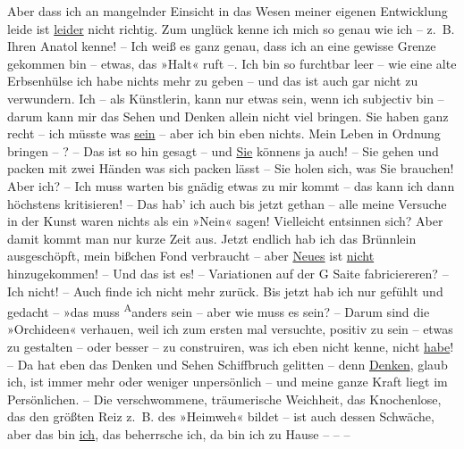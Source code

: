 \pstart
            Aber dass ich \introOben{}an\introOben{} mangelnder Einsicht in das Wesen meiner
               eigenen Entwicklung leide ist \uline{leider} nicht richtig.
               Zum unglück kenne ich mich so genau wie ich – z. B. Ihren Anatol kenne! – Ich weiß es ganz genau, dass ich an eine
               gewisse Grenze gekommen bin – etwas, das »Halt« ruft –. Ich bin so furchtbar leer –
               wie eine alte Erbsenhülse {\pb}ich habe nichts mehr zu geben – und das ist
               auch gar nicht zu verwundern. Ich – als Künstlerin, kann nur etwas sein, wenn ich
               subjectiv bin – darum kann mir das Sehen und Denken \introOben{}allein\introOben{}
               nicht viel bringen. Sie haben ganz recht – ich müsste was \uline{sein} – aber ich bin eben nichts. Mein Leben in Ordnung bringen – ? – Das ist
               so hin gesagt – und \uline{Sie} könnens ja auch! – Sie gehen
               und packen mit zwei Händen was sich packen lässt – Sie holen sich, was Sie brauchen!
               Aber ich? – Ich muss warten bis gnädig etwas zu mir kommt – das kann ich \introOben{}dann\introOben{} höchstens kritisieren! – Das hab' ich auch bis jetzt
               gethan – alle meine Versuche in der Kunst waren nichts als ein »Nein« sagen!
               Vielleicht entsinnen sich? Aber damit kommt man nur kurze Zeit aus. Jetzt endlich hab
               ich das Brünnlein ausgeschöpft, mein bißchen Fond verbraucht – aber \uline{Neues} ist \uline{nicht}
               hinzugekommen! – Und das ist es! – Variationen auf der G Saite fabriciereren? – Ich
               nicht! – Auch finde ich nicht mehr zurück. Bis jetzt hab ich nur gefühlt und gedacht
               – »das muss \substVorne{}\textsuperscript{A}\substDazwischen{}a\substHinten{}nders sein – {\pb}aber wie muss es sein? – Darum sind die »Orchideen« verhauen, weil ich zum ersten mal
               versuchte, positiv zu sein – etwas zu gestalten – oder besser – zu construiren, was
               ich eben nicht kenne, nicht \uline{habe}! – Da hat eben das
               Denken und Sehen Schiffbruch gelitten – denn \uline{Denken},
               glaub ich, ist immer mehr oder weniger unpersönlich – und meine ganze Kraft liegt im
               Persönlichen. – Die verschwommene, träumerische
               Weichheit, das Knochenlose, das den größten Reiz z. B. des »Heimweh« bildet – ist auch dessen Schwäche, aber das bin \uline{ich}, das beherrsche ich, da bin ich zu Hause – – –
